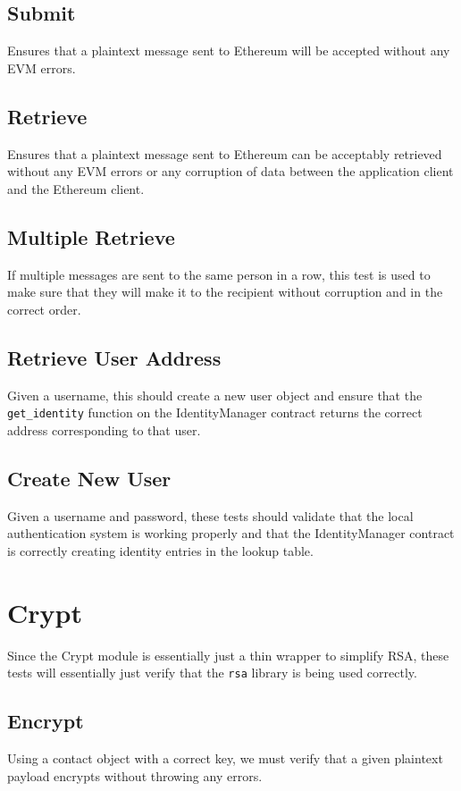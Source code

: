 \documentclass[titlepage]{report}
\begin{document}
\subsection{Submit}
Ensures that a plaintext message sent to \gls{Ethereum} will be accepted without any EVM errors.
\subsection{Retrieve}
Ensures that a plaintext message sent to \gls{Ethereum} can be acceptably retrieved without any EVM errors or any corruption of data between the application client and the \gls{Ethereum} client.
\subsection{Multiple Retrieve}
If multiple messages are sent to the same person in a row, this test is used to make sure that they will make it to the recipient without corruption and in the correct order.
\subsection{Retrieve User Address}
Given a username, this should create a new user object and ensure that the \texttt{get\_identity} function on the IdentityManager contract returns the correct address corresponding to that user.
\subsection{Create New User}
Given a username and password, these tests should validate that the local authentication system is working properly and that the IdentityManager contract is correctly creating identity entries in the lookup table.

\section{Crypt}
Since the Crypt module is essentially just a thin wrapper to simplify RSA, these tests will essentially just verify that the \texttt{rsa} library is being used correctly.
\subsection{Encrypt}
Using a contact object with a correct key, we must verify that a given plaintext payload encrypts without throwing any errors.
\end{document}
